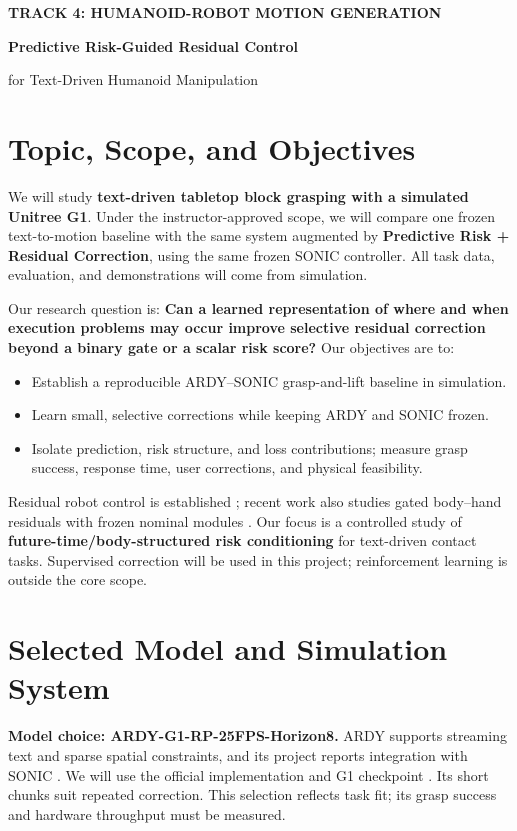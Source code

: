 \documentclass[11pt,a4paper]{article}
\begin{document}
\thispagestyle{fancy}
{\small\bfseries\color{accent}TRACK 4: HUMANOID-ROBOT MOTION GENERATION}\par
\vspace{4pt}
{\LARGE\bfseries Predictive Risk-Guided Residual Control\par
for Text-Driven Humanoid Manipulation\par}
\vspace{3pt}

\section{Topic, Scope, and Objectives}
We will study \textbf{text-driven tabletop block grasping with a simulated
Unitree G1}. Under the instructor-approved scope, we will compare one frozen
text-to-motion baseline with the same system augmented by \textbf{Predictive
Risk + Residual Correction}, using the same frozen SONIC controller.
All task data, evaluation, and demonstrations will come from simulation.

Our research question is: \textbf{Can a learned representation of where and
when execution problems may occur improve selective residual correction
beyond a binary gate or a scalar risk score?} Our objectives are to:
\begin{itemize}
  \item Establish a reproducible ARDY--SONIC grasp-and-lift baseline in simulation.
  \item Learn small, selective corrections while keeping ARDY and SONIC frozen.
  \item Isolate prediction, risk structure, and loss contributions; measure grasp
  success, response time, user corrections, and physical feasibility.
\end{itemize}
Residual robot control is established \cite{residual}; recent work also studies
gated body--hand residuals with frozen nominal modules \cite{gated}.
Our focus is a controlled study of \textbf{future-time/body-structured risk
conditioning} for text-driven contact tasks. Supervised correction will be
used in this project; reinforcement learning is outside the core scope.

\section{Selected Model and Simulation System}
\textbf{Model choice: ARDY-G1-RP-25FPS-Horizon8.}
ARDY supports streaming text and sparse spatial constraints, and its project
reports integration with SONIC \cite{ardy}. We will use the official
implementation \cite{ardycode} and G1 checkpoint \cite{ardycheckpoint}.
Its short chunks suit repeated correction. This selection reflects task fit;
its grasp success and hardware throughput must be measured.
\end{document}

